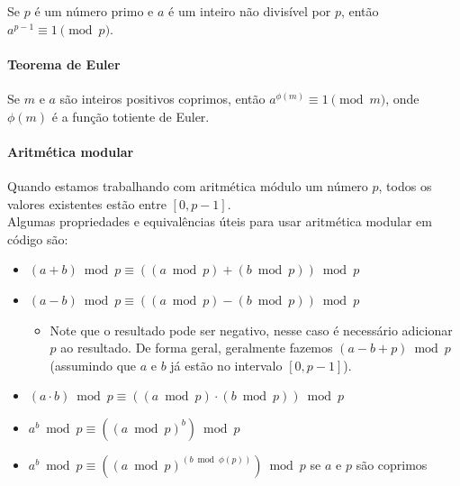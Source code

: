 Se $p$ é um número primo e $a$ é um inteiro não divisível por $p$, então $a^{p-1} \equiv 1 \pmod p$.

\paragraph{Teorema de Euler}

Se $m$ e $a$ são inteiros positivos coprimos, então $a^{\phi(m)} \equiv 1 \pmod m$, onde $\phi(m)$ é a função totiente de Euler.

\paragraph{Aritmética modular}

Quando estamos trabalhando com aritmética módulo um número $p$, todos os valores existentes estão entre $[0, p-1]$.\\
Algumas propriedades e equivalências úteis para usar aritmética modular em código são:
\begin{itemize}\setlength\itemsep{0pt}
    \item $(a + b) \bmod p \equiv ((a \bmod p) + (b \bmod p)) \bmod p$
    \item $(a - b) \bmod p \equiv ((a \bmod p) - (b \bmod p)) \bmod p$
    \begin{itemize}\setlength\itemsep{0pt}
        \item Note que o resultado pode ser negativo, nesse caso é necessário adicionar $p$ ao resultado. De forma geral, geralmente fazemos $(a - b + p) \bmod p$ (assumindo que $a$ e $b$ já estão no intervalo $[0, p-1]$).
    \end{itemize}
    \item $(a \cdot b) \bmod p \equiv ((a \bmod p) \cdot (b \bmod p)) \bmod p$
    \item $a^b \bmod p \equiv ((a \bmod p)^b) \bmod p$
    \item $a^b \bmod p \equiv ((a \bmod p)^{(b \bmod \phi(p))}) \bmod p$ se $a$ e $p$ são coprimos
\end{itemize}